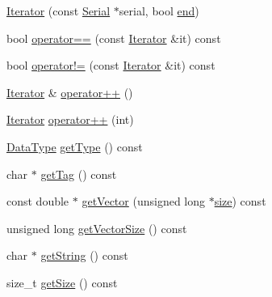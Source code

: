 \begin{DoxyCompactItemize}
\item 
\hyperlink{class_frame_lib___parameters_1_1_serial_1_1_iterator_aae8229457c25d32215f4b185712e3a57}{Iterator} (const \hyperlink{class_frame_lib___parameters_1_1_serial}{Serial} $\ast$serial, bool \hyperlink{class_frame_lib___parameters_1_1_serial_a25338dbe2059c9cd615db0596a09a646}{end})
\item 
bool \hyperlink{class_frame_lib___parameters_1_1_serial_1_1_iterator_a4db966a3c2253d5d9621b48f5c252069}{operator==} (const \hyperlink{class_frame_lib___parameters_1_1_serial_1_1_iterator}{Iterator} \&it) const
\item 
bool \hyperlink{class_frame_lib___parameters_1_1_serial_1_1_iterator_a67e9a2d5697b673eb73d06dd3277b005}{operator!=} (const \hyperlink{class_frame_lib___parameters_1_1_serial_1_1_iterator}{Iterator} \&it) const
\item 
\hyperlink{class_frame_lib___parameters_1_1_serial_1_1_iterator}{Iterator} \& \hyperlink{class_frame_lib___parameters_1_1_serial_1_1_iterator_ac20e3d1c69d06277d7e61bb83ed8ab5f}{operator++} ()
\item 
\hyperlink{class_frame_lib___parameters_1_1_serial_1_1_iterator}{Iterator} \hyperlink{class_frame_lib___parameters_1_1_serial_1_1_iterator_acdc3ee02f4092d85e8bf2dd9bd41dcda}{operator++} (int)
\item 
\hyperlink{_frame_lib___types_8h_ad8ed01ff3ff33333d8e19db4d2818bb6}{Data\+Type} \hyperlink{class_frame_lib___parameters_1_1_serial_1_1_iterator_a1ebdbdf7358988f436b7defcdb43f6c7}{get\+Type} () const
\item 
char $\ast$ \hyperlink{class_frame_lib___parameters_1_1_serial_1_1_iterator_a5776d57b0ad7e95938a3e009bc6f05e0}{get\+Tag} () const
\item 
const double $\ast$ \hyperlink{class_frame_lib___parameters_1_1_serial_1_1_iterator_a16f5466b512fb0235214ca9330047c75}{get\+Vector} (unsigned long $\ast$\hyperlink{class_frame_lib___parameters_1_1_serial_a04ad46904d9fd8119283eae663901886}{size}) const
\item 
unsigned long \hyperlink{class_frame_lib___parameters_1_1_serial_1_1_iterator_a2d1043e5b1162987f1d93eec9a880574}{get\+Vector\+Size} () const
\item 
char $\ast$ \hyperlink{class_frame_lib___parameters_1_1_serial_1_1_iterator_a88ed405201e461052c6b7b98c9785611}{get\+String} () const
\item 
size\+\_\+t \hyperlink{class_frame_lib___parameters_1_1_serial_1_1_iterator_a97ecd06f6b276dc85f7ac86afceacf67}{get\+Size} () const

\end{DoxyCompactItemize}
